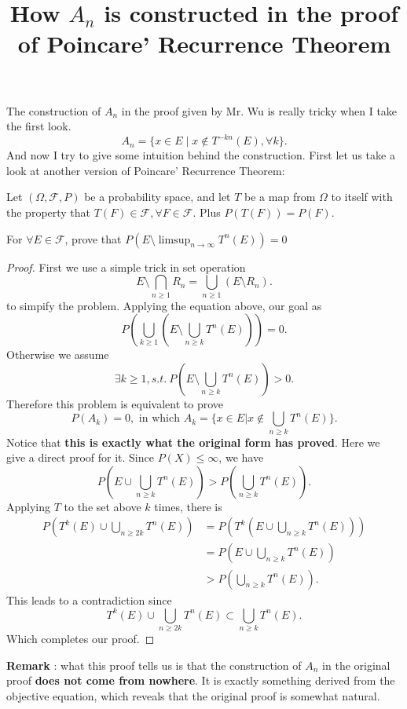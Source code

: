 
\title{How  $A_{n}$ is constructed in the proof of Poincare' Recurrence Theorem}

\maketitle
The construction of $A_{n}$ in the proof given by Mr. Wu is really tricky when 
I take the first look. 
\[
		A_{n} = \{x\in E  \mid  x \not \in T^{-kn}\left( E \right) , \forall k\} 
.\] 
And now I try to give some intuition behind the construction. 
First let us take a look at another version of Poincare' Recurrence Theorem:
\begin{pro}
		Let $\left( \Omega,\mathcal{F},P \right) $ be a probability space, and 
		let $T$ be a map from $\Omega$ to itself with the property 
		that $T\left( F \right) \in \mathcal{F}, \forall F\in \mathcal{ F}$. Plus
		$P\left( T\left( F \right)  \right) = P\left( F \right)$. 

		For $\forall E \in \mathcal{F}$, prove that $P\left( E \setminus
		\limsup_{n \to \infty}T^{n}\left( E \right)  \right) =0$
\end{pro}
\begin{proof}
		First we use a simple trick in set operation 
		\[
				E \setminus \bigcap_{n\ge 1} R_{n} = \bigcup_{n\ge 1} \left( E\setminus 
				R_{n} \right) 
		.\] 
		to simpify the problem. Applying the equation above, our goal as
		\[
				P\left( \bigcup_{k\ge 1} \left( 
				E \setminus \bigcup_{n\ge k} T^{n}(E) \right)  \right) = 0
		.\] 
		Otherwise we assume 
		\[
				\exists k\ge 1, s.t. \  P\left( E \setminus \bigcup_{n\ge k} 
				T^{n}\left( E \right) \right)  > 0
		.\] 
		Therefore this problem is equivalent to prove 
		\[
				P\left( A_k \right) =0,\text{ in which }  A_k = \{ x \in E| x \not\in \bigcup_{n\ge k} 
				T^{n}\left( E \right) \} 
		.\] 
		Notice that \textbf{this is exactly what the original form has proved}. 
		Here we give a direct proof for it. Since $P\left( X \right) \le \infty$, we
		have 
		\[
				P\left( E \cup \bigcup_{n\ge k} T^{n}\left( E \right)  \right)  > 
				P\left( \bigcup_{n\ge k} T^{n}\left( E \right)  \right) 
		.\] 
		Applying $T$ to the set above $k$ times, there is
		\begin{align*}
				P\left( T^{k}\left( E \right) \cup 
				\bigcup_{n\ge 2k} T^{n}\left( E \right) \right) &= 
				P \left( T^{k}\left( E \cup \bigcup_{n\ge k}T^{n}\left( E \right)   \right)  \right) \\ 
			&=  P\left(
		E \cup \bigcup_{n\ge k} T^{n}\left( E \right) \right)  \\
& > P\left(
			\bigcup_{n\ge k} T^{n}\left( E \right)  \right) 
		.\end{align*}
		This leads to a contradiction since 
		\[
				T^{k}\left( E \right) \cup \bigcup_{n\ge 2k} T^{n}(E) 
				\subset  \bigcup_{n\ge k} T^{n}(E)
		.\] 
		Which completes our proof.
\end{proof}

\noindent \textbf{Remark} : what this proof tells us is that the construction 
of $A_{n}$ in the original proof \textbf{does not come from nowhere}.
It is exactly something derived from the objective equation, which reveals 
that the original proof is somewhat natural.


